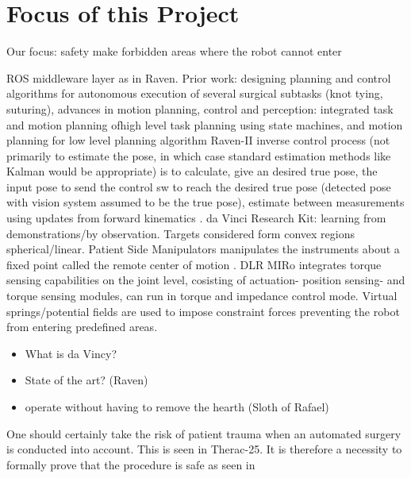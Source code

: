 \section{Focus of this Project}
Our focus:
safety
make forbidden areas where the robot cannot enter

ROS middleware layer as in Raven.
Prior work: designing planning and control algorithms for autonomous execution of several surgical subtasks (knot tying, suturing), advances in motion planning, control and perception: integrated task and motion planning ofhigh level task planning using state machines, and motion planning for low level planning algorithm  \citep{bib:raven_debride}
Raven-II inverse control process (not primarily to estimate the pose, in which case standard estimation methods like Kalman would be appropriate) is to calculate, give an desired true pose, the input pose to send the control sw to reach the desired true pose (detected pose with vision system assumed to be the true pose), estimate between measurements using updates from forward kinematics \citep{bib:raven_debride}.
da Vinci Research Kit: learning from demonstrations/by observation. Targets considered form convex regions spherical/linear. Patient Side Manipulators manipulates the instruments about a fixed point called the remote center of motion \citep{bib:raven_observ}.
DLR MIRo integrates torque sensing capabilities on the joint level, cosisting of actuation- position sensing- and torque sensing modules, can run in torque and impedance control mode. Virtual springs/potential fields are used to impose constraint forces preventing the robot from  entering predefined areas.

\begin{itemize}
\item What is da Vincy?
\item State of the art? (Raven)
\item operate without having to remove the hearth (Sloth of Rafael)
\end{itemize}
One should certainly take the risk of patient trauma when an automated surgery is conducted into account. This is seen in Therac-25. It is therefore a necessity to formally prove that the procedure is safe as seen in \citep{bib:safety}